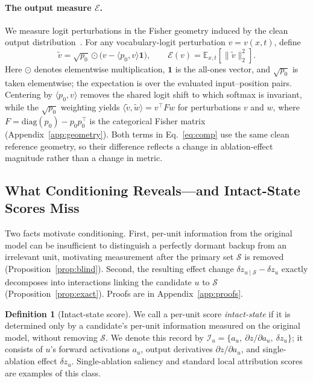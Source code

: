 \documentclass{article} %
\theoremstyle{plain}
\theoremstyle{definition}
\newtheorem{definition}{Definition}
\newcommand{\energy}{\mathcal{E}}
\newcommand{\dz}{\delta z}
\newcommand{\Sset}{\mathcal{S}}
\begin{document}
\paragraph{The output measure $\energy$.}
We measure logit perturbations in the Fisher geometry induced by the clean output distribution~\citep{amari1998natural}.
For any vocabulary-logit perturbation $v=v(x,t)$, define
\begin{equation}
\widetilde v
=
\sqrt{p_0}\odot
\bigl(v-\langle p_0,v\rangle\mathbf{1}\bigr),
\qquad
\energy(v)
=
\mathbb{E}_{x,t}\!\left[\|\widetilde v\|_2^2\right].
\label{eq:energy}
\end{equation}
Here $\odot$ denotes elementwise multiplication, $\mathbf{1}$ is the all-ones vector, and $\sqrt{p_0}$ is taken elementwise; the expectation is over the evaluated input--position pairs.
Centering by $\langle p_0,v\rangle$ removes the shared logit shift to which softmax is invariant, while the $\sqrt{p_0}$ weighting yields
$\langle\widetilde v,\widetilde w\rangle=v^\top Fw$ for perturbations $v$ and $w$, where
$F=\mathrm{diag}(p_0)-p_0p_0^\top$ is the categorical Fisher matrix
(Appendix~\ref{app:geometry}).
Both terms in Eq.~\ref{eq:comp} use the same clean reference geometry, so their difference reflects a change in ablation-effect magnitude rather than a change in metric.

\subsection{What Conditioning Reveals---and Intact-State Scores Miss}
\label{sec:theory}

Two facts motivate conditioning.
First, per-unit information from the original model can be insufficient to distinguish a perfectly dormant backup from an irrelevant unit, motivating measurement after the primary set $\Sset$ is removed (Proposition~\ref{prop:blind}).
Second, the resulting effect change $\dz_{u\mid\Sset}-\dz_u$ exactly decomposes into interactions linking the candidate $u$ to $\Sset$ (Proposition~\ref{prop:exact}).
Proofs are in Appendix~\ref{app:proofs}.

\begin{definition}[Intact-state score]
\label{def:intactscore}
We call a per-unit score \emph{intact-state} if it is determined only by a candidate's per-unit information measured on the original model, without removing
$\Sset$.
We denote this record by $\mathcal{I}_u=\{a_u,\ \partial z/\partial a_u,\ \dz_u\}$; it consists of $u$'s forward activations $a_u$, output derivatives $\partial z/\partial a_u$, and single-ablation effect $\dz_u$.
Single-ablation saliency and standard local attribution scores are examples
of this class. %
\end{definition}
\end{document}
